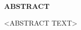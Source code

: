 \begin{center}
    {\fontsize{18pt}{0pt} \MakeUppercase{\textbf{abstract}}}
\vspace*{24pt}
\end{center}


<ABSTRACT TEXT>
